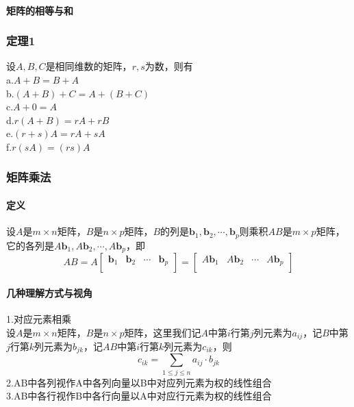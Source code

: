 \documentclass{article}
\newcommand{\ve}{\boldsymbol}
\begin{document}
\begin{CJK}{UTF8}{gkai}
\paragraph{矩阵的相等与和\\}
\subsubsection{定理1}
设$A,B,C$是相同维数的矩阵，$r,s$为数，则有\\
a.$A+B=B+A$\\
b.$(A+B)+C=A+(B+C)$\\
c.$A+0=A$\\
d.$r(A+B)=rA+rB$\\
e.$(r+s)A=rA+sA$\\
f.$r(sA)=(rs)A$\\
\subsubsection{矩阵乘法}
\paragraph{定义\\}
设$A$是$m\times n$矩阵，$B$是$n\times p$矩阵，$B$的列是$\ve{b}_1,\ve{b}_2,\cdots,\ve{b}_p$则乘积$AB$是$m\times p$矩阵，它的各列是$A\ve{b}_1,A\ve{b}_2,\cdots,A\ve{b}_p$，即
\[
    AB=A
\begin{bmatrix}
    \ve{b}_1&\ve{b}_2&\cdots&\ve{b}_p\\
\end{bmatrix}
=
\begin{bmatrix}    
    A\ve{b}_1&A\ve{b}_2&\cdots&A\ve{b}_p\\
\end{bmatrix}\]
\paragraph{几种理解方式与视角\\}
1.对应元素相乘\\
设$A$是$m\times n$矩阵，$B$是$n\times p$矩阵，这里我们记$A$中第$i$行第$j$列元素为$a_{ij}$，记$B$中第$j$行第$k$列元素为$b_{jk}$，记$AB$中第$i$行第$k$列元素为$c_{ik}$，则\\
\[c_{ik}=\sum_{1\leq j\leq n}a_{ij}\cdot b_{jk}\]
2.AB中各列视作A中各列向量以B中对应列元素为权的线性组合\\
3.AB中各行视作B中各行向量以A中对应行元素为权的线性组合\\


\end{CJK}
\end{document}
